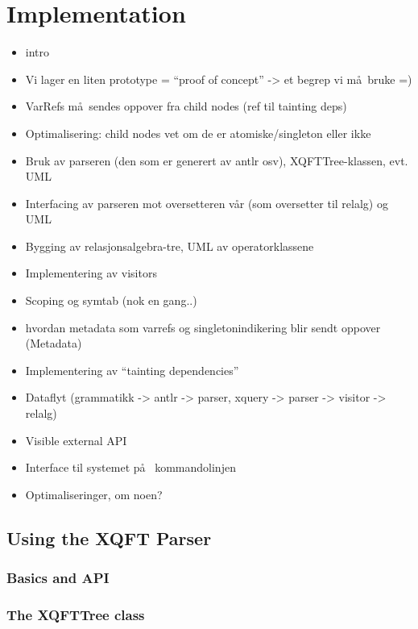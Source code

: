 \chapter{Implementation}
\label{chapter:implementation}

\begin{itemize}
  \item intro
  \item Vi lager en liten prototype = ``proof of concept'' -> et begrep vi m\aa~bruke =)
  \item VarRefs m\aa~sendes oppover fra child nodes (ref til tainting deps)
  \item Optimalisering: child nodes vet om de er atomiske/singleton eller ikke
\end{itemize}

\begin{itemize}
  \item Bruk av parseren (den som er generert av antlr osv), XQFTTree-klassen,
  evt. UML
  \item Interfacing av parseren mot oversetteren v\aa r (som oversetter til
  relalg) og UML
  \item Bygging av relasjonsalgebra-tre, UML av operatorklassene
  \item Implementering av visitors
  \item Scoping og symtab (nok en gang..)
  \item hvordan metadata som varrefs og singletonindikering blir sendt oppover
  (Metadata)
  \item Implementering av ``tainting dependencies''
  \item Dataflyt (grammatikk -> antlr -> parser, xquery -> parser -> visitor ->
  relalg)
  \item Visible external API
  \item Interface til systemet p\aa~ kommandolinjen
  \item Optimaliseringer, om noen? 
\end{itemize}


\section{Using the XQFT Parser}
\subsection{Basics and API}
\subsection{The XQFTTree class}
